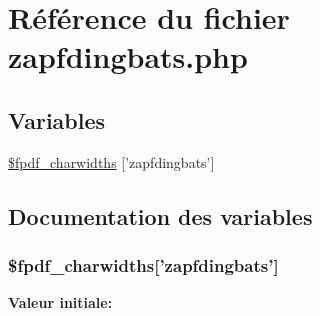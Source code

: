 \hypertarget{zapfdingbats_8php}{
\section{R\'{e}f\'{e}rence du fichier zapfdingbats.php}
\label{zapfdingbats_8php}
}
\subsection*{Variables}
\begin{CompactItemize}
\item 
\hyperlink{zapfdingbats_8php_a0}{\$fpdf\_\-charwidths} \mbox{[}'zapfdingbats'\mbox{]}
\end{CompactItemize}


\subsection{Documentation des variables}
\hypertarget{zapfdingbats_8php_a0}{
\subsubsection[\$fpdf\_\-charwidths]{\setlength{\rightskip}{0pt plus 5cm}\$fpdf\_\-charwidths\mbox{[}'zapfdingbats'\mbox{]}}}
\label{zapfdingbats_8php_a0}


{\bf Valeur initiale:}

